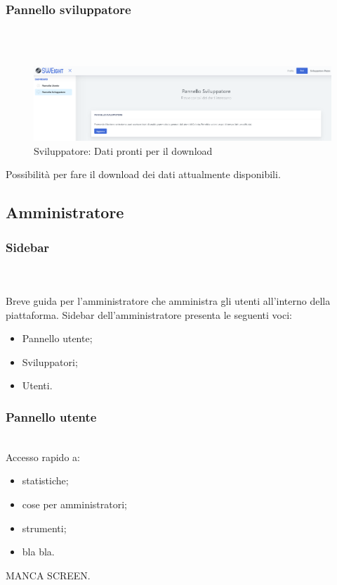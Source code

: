     	\subsubsection{Pannello sviluppatore}\mbox{}\\ \\
    		\begin{figure}[H]
			\centering
			\includegraphics[width=17cm]{sez/img/sviluppatore/datipronti.PNG}
			\caption{Sviluppatore: Dati pronti per il download}\label{fig:1}
			\end{figure}
		  Possibilità per fare il download dei dati attualmente disponibili.




	\newpage
	\subsection{Amministratore}
		\subsubsection{Sidebar}\mbox{}\\ \\
		  Breve guida per l'amministratore che amministra gli utenti all'interno della piattaforma. Sidebar dell'amministratore presenta le seguenti voci:
			\begin{itemize}
			\item Pannello utente;
			\item Sviluppatori;
			\item Utenti.
			\end{itemize}



		\subsubsection{Pannello utente}\mbox{}\\
		  Accesso rapido a:
			\begin{itemize}
			\item statistiche;
			\item cose per amministratori;
			\item strumenti;
			\item bla bla.
			\end{itemize}
			  MANCA SCREEN.




